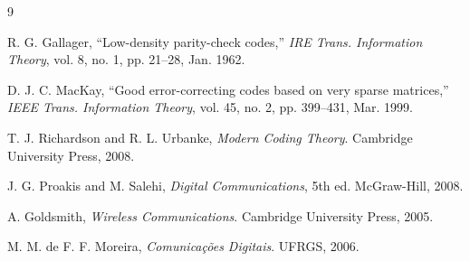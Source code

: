 \documentclass[conference]{IEEEtran}
\begin{document}
\begin{thebibliography}{9}

R. G. Gallager, ``Low-density parity-check codes,'' \textit{IRE Trans. Information Theory}, vol. 8, no. 1, pp. 21--28, Jan. 1962.

D. J. C. MacKay, ``Good error-correcting codes based on very sparse matrices,'' \textit{IEEE Trans. Information Theory}, vol. 45, no. 2, pp. 399--431, Mar. 1999.

T. J. Richardson and R. L. Urbanke, \textit{Modern Coding Theory}. Cambridge University Press, 2008.

J. G. Proakis and M. Salehi, \textit{Digital Communications}, 5th ed. McGraw-Hill, 2008.

A. Goldsmith, \textit{Wireless Communications}. Cambridge University Press, 2005.

M. M. de F. F. Moreira, \textit{Comunicações Digitais}. UFRGS, 2006.

\end{thebibliography}
\end{document}
